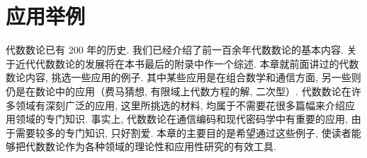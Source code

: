 \chapter{应用举例}\label{ch:9}

代数数论已有 $200$ 年的历史. 我们已经介绍了前一百余年代数数论的基本内容. 关于近代代数数论的发展将在本书最后的附录中作一个综述. 本章就前面讲过的代数数论内容, 挑选一些应用的例子. 其中某些应用是在组合数学和通信方面, 另一些则仍是在数论中的应用（费马猜想, 有限域上代数方程的解, 二次型）. 代数数论在许多领域有深刻广泛的应用, 这里所挑选的材料, 均属于不需要花很多篇幅来介绍应用领域的专门知识. 事实上, 代数数论在通信编码和现代密码学中有重要的应用, 由于需要较多的专门知识, 只好割爱. 本章的主要目的是希望通过这些例子, 使读者能够把代数数论作为各种领域的理论性和应用性研究的有效工具.






